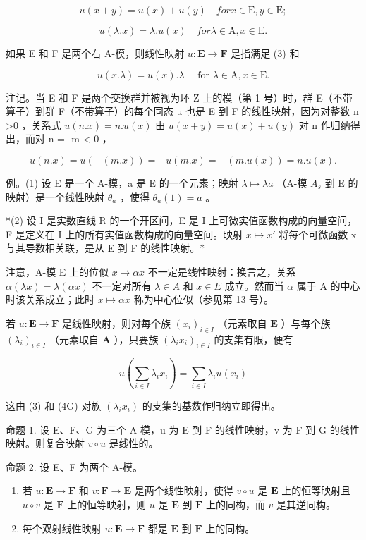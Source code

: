 \[
u (x + y) = u (x) + u (y) \quad for x \in \mathrm{E}, y \in \mathrm{E};\tag{4G}
\]

\[
u (\lambda . x) = \lambda . u (x) \quad for \lambda \in \mathrm{A}, x \in \mathrm{E}.
\]

如果 E 和 F 是两个右 A-模，则线性映射 \(u: \mathbf{E} \to \mathbf{F}\) 是指满足 (3) 和

\[
u (x . \lambda) = u (x). \lambda \quad \text { for } \lambda \in \mathrm{A}, x \in \mathrm{E}.\tag{4D}
\]

注记。当 E 和 F 是两个交换群并被视为环 Z 上的模（第 1 号）时，群 E（不带算子）到群 F（不带算子）的每个同态 u 也是 E 到 F 的线性映射，因为对整数 n \textgreater0 ，关系式 \(u(n.x) = n.u(x)\) 由 \(u(x + y) = u(x) + u(y)\) 对 n 作归纳得出，而对 n = -m \textless{} 0 ，

\[
u (n. x) = u (- (m. x)) = - u (m. x) = - (m. u (x)) = n. u (x).
\]

例。(1) 设 E 是一个 A-模，a 是 E 的一个元素；映射 \(\lambda\mapsto\lambda a\) （A-模 \(A_{s}\) 到 E 的映射）是一个线性映射 \(\theta_{a}\) ，使得 \(\theta_{a}(1)=a\) 。

*(2) 设 I 是实数直线 R 的一个开区间，E 是 I 上可微实值函数构成的向量空间，F 是定义在 I 上的所有实值函数构成的向量空间。映射 \(x \mapsto x'\) 将每个可微函数 x 与其导数相关联，是从 E 到 F 的线性映射。*

注意，A-模 E 上的位似 \(x \mapsto \alpha x\) 不一定是线性映射：换言之，关系 \(\alpha(\lambda x) = \lambda(\alpha x)\) 不一定对所有 \(\lambda \in A\) 和 \(x \in E\) 成立。然而当 \(\alpha\) 属于 A 的中心时该关系成立；此时 \(x \mapsto \alpha x\) 称为中心位似（参见第 13 号）。

若 \(u: \mathbf{E} \to \mathbf{F}\) 是线性映射，则对每个族 \((x_{i})_{i \in I}\) （元素取自 \(\mathbf{E}\) ）与每个族 \((\lambda_{i})_{i \in I}\) （元素取自 \(\mathbf{A}\) ），只要族 \((\lambda_{i}x_{i})_{i \in I}\) 的支集有限，便有

\[
u \left(\sum_ {i \in I} \lambda_ {i} x _ {i}\right) = \sum_ {i \in I} \lambda_ {i} u (x _ {i})\tag{5}
\]

这由 (3) 和 (4G) 对族 \((\lambda_{i}x_{i})\) 的支集的基数作归纳立即得出。

命题 1. 设 E、F、G 为三个 A-模，u 为 E 到 F 的线性映射，v 为 F 到 G 的线性映射。则复合映射 \(v \circ u\) 是线性的。

命题 2. 设 E、F 为两个 A-模。

\begin{enumerate}
\def\labelenumi{(\arabic{enumi})}
\item
  若 \(u: \mathbf{E} \to \mathbf{F}\) 和 \(v: \mathbf{F} \to \mathbf{E}\) 是两个线性映射，使得 \(v \circ u\) 是 \(\mathbf{E}\) 上的恒等映射且 \(u \circ v\) 是 \(\mathbf{F}\) 上的恒等映射，则 \(u\) 是 \(\mathbf{E}\) 到 \(\mathbf{F}\) 上的同构，而 \(v\) 是其逆同构。
\item
  每个双射线性映射 \(u: \mathbf{E} \to \mathbf{F}\) 都是 \(\mathbf{E}\) 到 \(\mathbf{F}\) 上的同构。
\end{enumerate}

